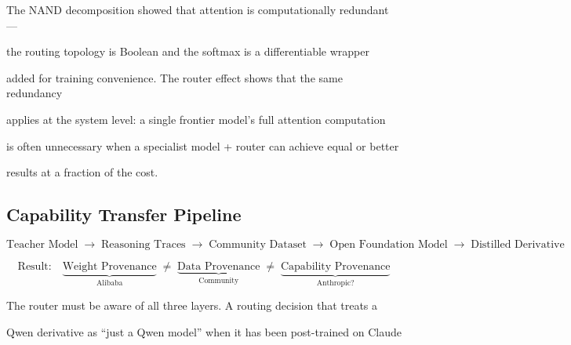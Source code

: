 The NAND decomposition showed that attention is computationally redundant ---


the routing topology is Boolean and the softmax is a differentiable wrapper


added for training convenience. The router effect shows that the same redundancy


applies at the system level: a single frontier model's full attention computation


is often unnecessary when a specialist model + router can achieve equal or better


results at a fraction of the cost.





\subsection{Capability Transfer Pipeline}





\[


\text{Teacher Model}


\;\rightarrow\;


\text{Reasoning Traces}


\;\rightarrow\;


\text{Community Dataset}


\;\rightarrow\;


\text{Open Foundation Model}


\;\rightarrow\;


\text{Distilled Derivative}


\]





\[


\text{Result:}\quad


\underbrace{\text{Weight Provenance}}_{\text{Alibaba}}


\;\neq\;


\underbrace{\text{Data Provenance}}_{\text{Community}}


\;\neq\;


\underbrace{\text{Capability Provenance}}_{\text{Anthropic?}}


\]





The router must be aware of all three layers. A routing decision that treats a


Qwen derivative as ``just a Qwen model'' when it has been post-trained on Claude



